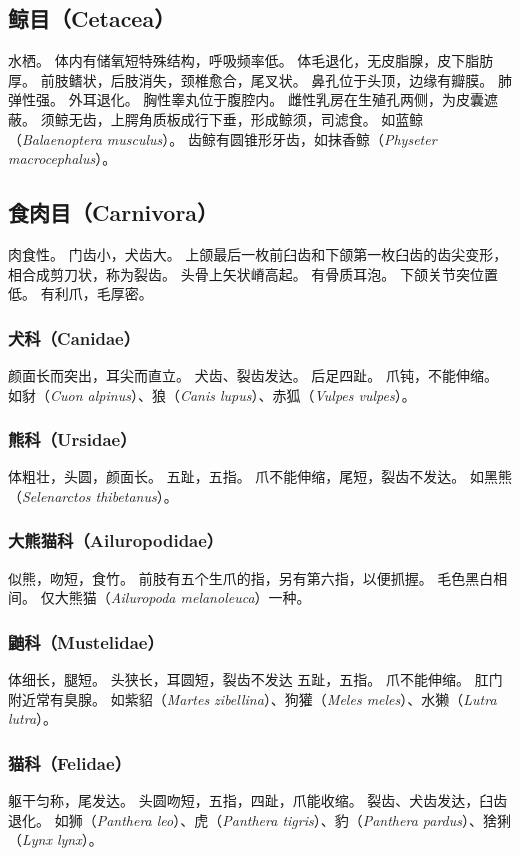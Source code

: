 \documentclass[11pt]{article}
\begin{document}
\subsection{鲸目（Cetacea）}
水栖。
体内有储氧短特殊结构，呼吸频率低。
体毛退化，无皮脂腺，皮下脂肪厚。
前肢鳍状，后肢消失，颈椎愈合，尾叉状。
鼻孔位于头顶，边缘有瓣膜。
肺弹性强。
外耳退化。
胸性睾丸位于腹腔内。
雌性乳房在生殖孔两侧，为皮囊遮蔽。
须鲸无齿，上腭角质板成行下垂，形成鲸须，司滤食。
如蓝鲸（\textit{Balaenoptera musculus}）。
齿鲸有圆锥形牙齿，如抹香鲸（\textit{Physeter macrocephalus}）。

\subsection{食肉目（Carnivora）}
肉食性。
门齿小，犬齿大。
上颌最后一枚前臼齿和下颌第一枚臼齿的齿尖变形，相合成剪刀状，称为裂齿。
头骨上矢状嵴高起。
有骨质耳泡。
下颌关节突位置低。
有利爪，毛厚密。

\subsubsection{犬科（Canidae）}
颜面长而突出，耳尖而直立。
犬齿、裂齿发达。
后足四趾。
爪钝，不能伸缩。
如豺（\textit{Cuon alpinus}）、狼（\textit{Canis lupus}）、赤狐（\textit{Vulpes vulpes}）。

\subsubsection{熊科（Ursidae）}
体粗壮，头圆，颜面长。
五趾，五指。
爪不能伸缩，尾短，裂齿不发达。
如黑熊（\textit{Selenarctos thibetanus}）。

\subsubsection{大熊猫科（Ailuropodidae）}
似熊，吻短，食竹。
前肢有五个生爪的指，另有第六指，以便抓握。
毛色黑白相间。
仅大熊猫（\textit{Ailuropoda melanoleuca}）一种。

\subsubsection{鼬科（Mustelidae）}
体细长，腿短。
头狭长，耳圆短，裂齿不发达
五趾，五指。
爪不能伸缩。
肛门附近常有臭腺。
如紫貂（\textit{Martes zibellina}）、狗獾（\textit{Meles meles}）、水獭（\textit{Lutra lutra}）。

\subsubsection{猫科（Felidae）}
躯干匀称，尾发达。
头圆吻短，五指，四趾，爪能收缩。
裂齿、犬齿发达，臼齿退化。
如狮（\textit{Panthera leo}）、虎（\textit{Panthera tigris}）、豹（\textit{Panthera pardus}）、猞猁（\textit{Lynx lynx}）。
\end{document}
